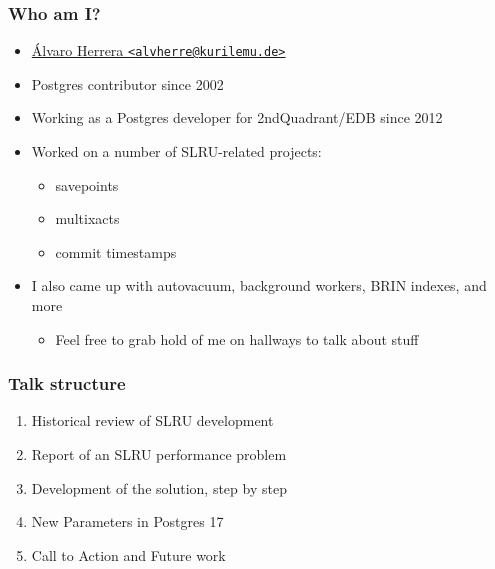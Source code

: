 \newcommand{\linksize}{\scriptsize}


\begin{frame}[plain]
  \titlepage
\end{frame}

\begin{frame}
  \frametitle{Who am I?}
  \begin{itemize}
    \item \href{mailto:alvherre@kurilemu.de}{Álvaro Herrera \texttt{<alvherre@kurilemu.de>}}
    \item Postgres contributor since 2002
    \item Working as a Postgres developer for 2ndQuadrant/EDB since 2012
    \item Worked on a number of SLRU-related projects:
      \begin{itemize}
	\item savepoints
	\item multixacts
	\item commit timestamps
      \end{itemize}
    \item \linksize I also came up with autovacuum, background workers, BRIN indexes, and more
    \begin{itemize} \item \linksize Feel free to grab hold of me on hallways to talk about stuff \end{itemize}
  \end{itemize}
\end{frame}

\begin{frame}
  \frametitle{Talk structure}
  \begin{enumerate}
    \item Historical review of SLRU development
    \item Report of an SLRU performance problem
    \item Development of the solution, step by step
    \item New Parameters in Postgres 17
    \item Call to Action and Future work
  \end{enumerate}
\end{frame}

